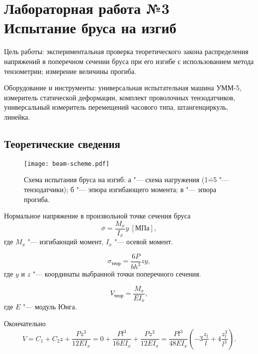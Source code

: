 \section{Лабораторная работа №3\\
\Large Испытание бруса на изгиб}

Цель работы: экспериментальная проверка теоретического закона распределения напряжений в поперечном сечении бруса при его изгибе с использованием метода тензометрии; измерение величины прогиба.

Оборудование и инструменты: универсальная испытательная машина УММ-5, измеритель статической деформации, комплект проволочных тензодатчиков, универсальный измеритель перемещений часового типа, штангенциркуль, линейка.

\subsection{Теоретические сведения}

\begin{figure}[!ht]
    \centering
    \texttt{[image: beam-scheme.pdf]}
    \caption{Схема испытания бруса на изгиб:
        а "--- схема нагружения (1\==5 "--- тензодатчики);
        б "--- эпюра изгибающего момента;
        в "--- эпюра прогиба.
    }
    \label{fig:beam-scheme}
\end{figure}

Нормальное напряжение в произвольной точке сечения бруса
\[
    \sigma = \frac{M_x}{I_x}y~[МПа],
\]
где $M_x$ "--- изгибающий момент, $I_x$ "--- осевой момент.

\[
    \sigma_{теор} = \frac{6 P}{b h^3} z y,
\]
где $y$ и $z$ "--- координаты выбранной точки поперечного сечения.

\[
    V_{теор} = \frac{M_x}{E I_x},
\]
где $E$ "--- модуль Юнга.

Окончательно
\[
    V
    = C_1 + C_2 z + \frac{P z^3}{12 E I_x}
    = 0 + \frac{P l^3}{16 E I_x} + \frac{P z^3}{12 E I_x}
    = \frac{P l^3}{48 E I_x} \left(-3 \frac{z_l}{l} + 4 \frac{z_l^3}{l^3}\right).
\]

